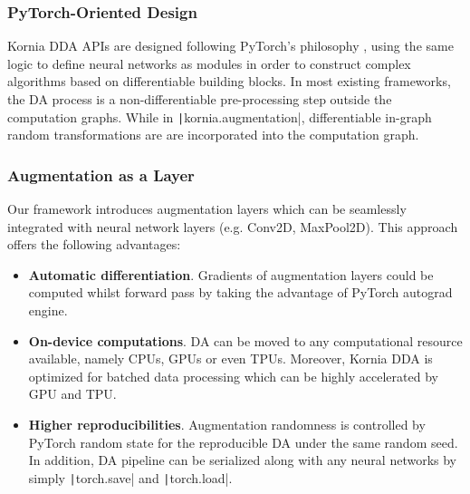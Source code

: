 \subsubsection{PyTorch-Oriented Design}

Kornia DDA APIs are designed following PyTorch's philosophy \cite{paszke2017automatic}, using the same logic to define neural networks as modules in order to construct complex algorithms based on differentiable building blocks.
In most existing frameworks, the DA process is a non-differentiable pre-processing step outside the computation graphs. 
While in \texttt|kornia.augmentation|, differentiable in-graph random transformations are are incorporated into the computation graph. 



\subsubsection{Augmentation as a Layer}

Our framework introduces augmentation layers which can be seamlessly integrated with neural network layers (e.g. Conv2D, MaxPool2D). This approach offers the following advantages:

\begin{itemize}[leftmargin=*]
    \item {\bf Automatic differentiation}. Gradients of augmentation layers could be computed whilst forward pass by taking the advantage of PyTorch autograd engine.
    \item {\bf On-device computations}. DA can be moved to any computational resource available, namely CPUs, GPUs or even TPUs. Moreover, Kornia DDA is optimized for batched data processing which can be highly accelerated by GPU and TPU. 
    \item {\bf Higher reproducibilities}. Augmentation randomness is controlled by
    PyTorch random state for the reproducible DA under the same random seed.
    In addition, DA pipeline can be serialized along with any neural networks by simply \texttt|torch.save| and \texttt|torch.load|.
    
\end{itemize}


